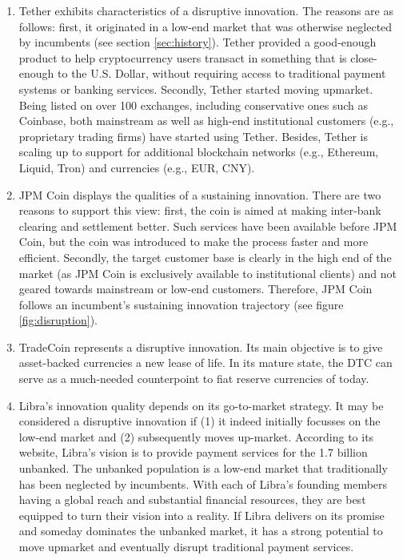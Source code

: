 \documentclass[conference]{IEEEtran}
\begin{document}
\begin{enumerate}
	\item Tether exhibits characteristics of a disruptive innovation. The reasons are as follows: first, it originated in a low-end market that was otherwise neglected by incumbents (see section \ref{sec:history}). Tether provided a good-enough product to help cryptocurrency users transact in something that is close-enough to the U.S. Dollar, without requiring access to traditional payment systems or banking services. Secondly, Tether started moving upmarket. Being listed on over 100 exchanges, including conservative ones such as Coinbase, both mainstream as well as high-end institutional customers (e.g., proprietary trading firms) have started using Tether. Besides, Tether is scaling up to support for additional blockchain networks (e.g., Ethereum, Liquid, Tron) and currencies (e.g., EUR, CNY).
	\item JPM Coin displays the qualities of a sustaining innovation. There are two reasons to support this view: first, the coin is aimed at making inter-bank clearing and settlement better. Such services have been available before JPM Coin, but the coin was introduced to make the process faster and more efficient. Secondly, the target customer base is clearly in the high end of the market (as JPM Coin is exclusively available to institutional clients) and not geared towards mainstream or low-end customers. Therefore, JPM Coin follows an incumbent's sustaining innovation trajectory (see figure \ref{fig:disruption}).
	\item TradeCoin represents a disruptive innovation. Its main objective is to give asset-backed currencies a new lease of life. In its mature state, the DTC can serve as a much-needed counterpoint to fiat reserve currencies of today.
	\item Libra's innovation quality depends on its go-to-market strategy. It may be considered a disruptive innovation if (1) it indeed initially focusses on the low-end market and (2) subsequently moves up-market. According to its website, Libra's vision is to provide payment services for the 1.7 billion unbanked. The unbanked population is a low-end market that traditionally has been neglected by incumbents. With each of Libra's founding members having a global reach and substantial financial resources, they are best equipped to turn their vision into a reality. If Libra delivers on its promise and someday dominates the unbanked market, it has a strong potential to move upmarket and eventually disrupt traditional payment services.
\end{enumerate}
\end{document}
